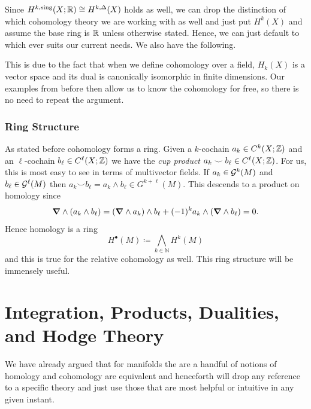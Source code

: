 \documentclass{article}
\begin{document}
Since $H^{k,\textrm{sing}}(X;\mathbb{R}) \cong H^{k,\Delta}(X)$ holds as well, we can drop the distinction of which cohomology theory we are working with as well and just put $H^k(X)$ and assume the base ring is $\mathbb{R}$ unless otherwise stated. Hence, we can just default to which ever suits our current needs. We also have the following.

This is due to the fact that when we define cohomology over a field, $H_k(X)$ is a vector space and its dual is canonically isomorphic in finite dimensions. Our examples from before then allow us to know the cohomology for free, so there is no need to repeat the argument.

\subsubsection{Ring Structure}

As stated before cohomology forms a ring. Given a $k$-cochain $a_k\in C^k(X;\mathbb{Z})$ and an $\ell$-cochain $b_\ell \in C^\ell(X;\mathbb{Z})$ we have the \emph{cup product} $a_k \smile b_\ell \in C^\ell(X;\mathbb{Z})$. For us, this is most easy to see in terms of multivector fields. If $a_k\in \mathcal{G}^k(M)$ and $b_\ell \in \mathcal{G}^\ell(M)$ then $a_k \smile b_\ell = a_k \wedge b_\ell \in G^{k+\ell}(M)$. This descends to a product on homology since 
\begin{align}
\boldsymbol{\nabla} \wedge (a_k \wedge b_\ell) = (\boldsymbol{\nabla} \wedge a_k) \wedge b_\ell + (-1)^k a_k \wedge (\boldsymbol{\nabla} \wedge b_\ell) = 0.
\end{align}
Hence homology is a ring
\begin{equation}
H^\bullet (M) \coloneqq \bigwedge_{k \in \mathbb{N}} H^k(M)
\end{equation}
and this is true for the relative cohomology as well. This ring structure will be immensely useful.


\section{Integration, Products, Dualities, and Hodge Theory}

We have already argued that for manifolds the are a handful of notions of homology and cohomology are equivalent and henceforth will drop any reference to a specific theory and just use those that are most helpful or intuitive in any given instant. 
\end{document}
